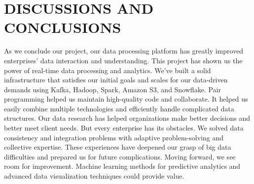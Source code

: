 \documentclass[conference]{IEEEtran}
\begin{document}
\section{DISCUSSIONS AND CONCLUSIONS}
As we conclude our project, our data processing platform has greatly improved enterprises' data interaction and understanding. This project has shown us the power of real-time data processing and analytics. We've built a solid infrastructure that satisfies our initial goals and scales for our data-driven demands using Kafka, Hadoop, Spark, Amazon S3, and Snowflake. Pair programming helped us maintain high-quality code and collaborate. It helped us easily combine multiple technologies and efficiently handle complicated data structures. Our data research has helped organizations make better decisions and better meet client needs. But every enterprise has its obstacles. We solved data consistency and integration problems with adaptive problem-solving and collective expertise. These experiences have deepened our grasp of big data difficulties and prepared us for future complications. Moving forward, we see room for improvement. Machine learning methods for predictive analytics and advanced data visualization techniques could provide value. 
\end{document}
